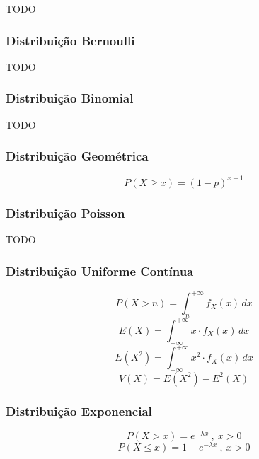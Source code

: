 \documentclass[11pt, a4paper]{article}
\begin{document}
TODO

\subsubsection*{Distribuição Bernoulli}

TODO

\subsubsection*{Distribuição Binomial}

TODO

\subsubsection*{Distribuição Geométrica}

\begin{equation*}
    P(X \geq x) = (1-p)^{x-1}
\end{equation*}

\subsubsection*{Distribuição Poisson}

TODO

\subsubsection*{Distribuição Uniforme Contínua}

\begin{equation*}
    P(X > n) = \int_{n}^{+\infty} f_X(x) \, dx
\end{equation*}
\begin{equation*}
    E(X) = \int_{-\infty}^{+\infty} x \cdot f_X(x) \, dx
\end{equation*}
\begin{equation*}
    E(X^2) = \int_{-\infty}^{+\infty} x^2 \cdot f_X(x) \, dx
\end{equation*}
\begin{equation*}
    V(X) = E(X^2) - E^2(X)
\end{equation*}

\subsubsection*{Distribuição Exponencial}

\begin{equation*}
    P(X > x) = e^{-\lambda x}\ , \ x > 0
\end{equation*}
\begin{equation*}
    P(X \leq x) = 1 - e^{-\lambda x}\ , \ x > 0
\end{equation*}
\end{document}
